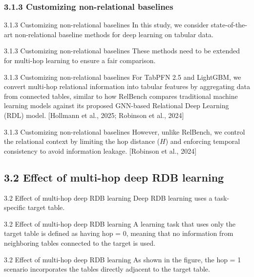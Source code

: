 \documentclass[aspectratio=169,10pt]{beamer}
\newcommand{\cit}[1]{{\scriptsize\color{gray}[#1]}}
\begin{document}
\subsubsection{3.1.3 Customizing non-relational baselines}

\begin{frame}{3.1.3 Customizing non-relational baselines}
In this study, we consider state-of-the-art non-relational baseline methods for deep learning on tabular data.
\end{frame}

\begin{frame}{3.1.3 Customizing non-relational baselines}
These methods need to be extended for multi-hop learning to ensure a fair comparison.
\end{frame}

\begin{frame}{3.1.3 Customizing non-relational baselines}
For TabPFN 2.5 and LightGBM, we convert multi-hop relational information into tabular features by aggregating data from connected tables, similar to how RelBench compares traditional machine learning models against its proposed GNN-based Relational Deep Learning (RDL) model.
\cit{Hollmann et al., 2025; Robinson et al., 2024}
\end{frame}

\begin{frame}{3.1.3 Customizing non-relational baselines}
However, unlike RelBench, we control the relational context by limiting the hop distance ($H$) and enforcing temporal consistency to avoid information leakage.
\cit{Robinson et al., 2024}
\end{frame}

\subsection{3.2 Effect of multi-hop deep RDB learning}

\begin{frame}{3.2 Effect of multi-hop deep RDB learning}
Deep RDB learning uses a task-specific target table.
\end{frame}

\begin{frame}{3.2 Effect of multi-hop deep RDB learning}
A learning task that uses only the target table is defined as having hop = 0, meaning that no information from neighboring tables connected to the target is used.
\end{frame}

\begin{frame}{3.2 Effect of multi-hop deep RDB learning}
As shown in the figure, the hop = 1 scenario incorporates the tables directly adjacent to the target table.
\end{frame}
\end{document}
